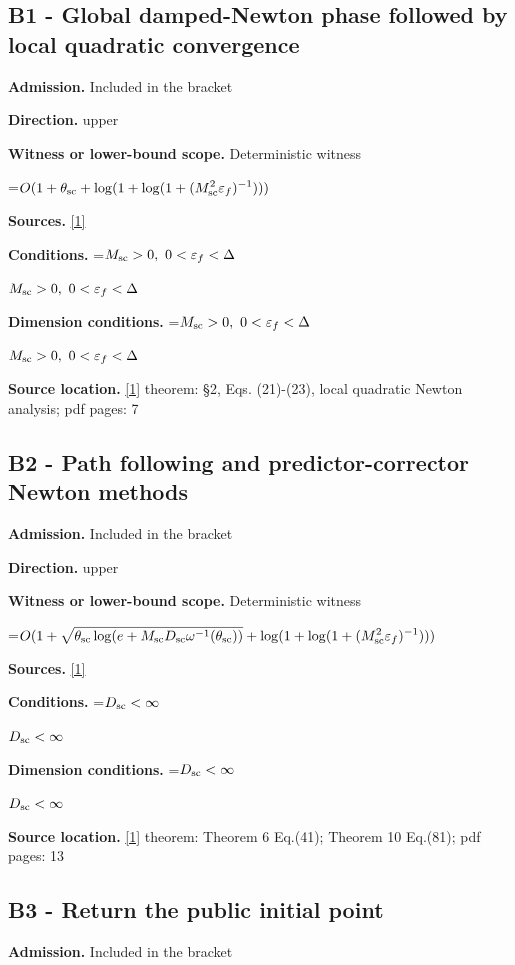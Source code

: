 \documentclass[10pt,a4paper]{article}
\newcommand{\AtlasMath}[1]{\par\begingroup\centering\setbox0=\hbox{$\displaystyle #1$}\ifdim\wd0>1.4\linewidth\typeout{ATLAS WIDE FORMULA: \the\wd0}\fi\ifdim\wd0>\linewidth\resizebox{\linewidth}{!}{\box0}\else\box0\fi\par\endgroup}
\newcommand{\AtlasInlineMath}[1]{\begingroup\setbox0=\hbox{$#1$}\ifdim\wd0>.4\linewidth\endgroup\AtlasMath{#1}\else\endgroup$#1$\fi}
\begin{document}
\subsection{B1 - Global damped-Newton phase followed by local quadratic convergence}
\textbf{Admission.} Included in the bracket

\textbf{Direction.} upper

\textbf{Witness or lower-bound scope.} Deterministic witness

\AtlasMath{O(1+\theta_{\rm sc}+\log(1+\log(1+(M_{\rm sc}^2\varepsilon_f)^{-1})))}
\textbf{Sources.} \href{https://arxiv.org/pdf/2408.11022v1}{[1]}

\textbf{Conditions.} \AtlasInlineMath{M_{\rm sc}>0,\ 0<\varepsilon_f<\Delta}

\textbf{Dimension conditions.} \AtlasInlineMath{M_{\rm sc}>0,\ 0<\varepsilon_f<\Delta}

\textbf{Source location.} \href{https://arxiv.org/pdf/2408.11022v1}{[1]} theorem: §2, Eqs. (21)-(23), local quadratic Newton analysis; pdf pages: 7

\subsection{B2 - Path following and predictor-corrector Newton methods}
\textbf{Admission.} Included in the bracket

\textbf{Direction.} upper

\textbf{Witness or lower-bound scope.} Deterministic witness

\AtlasMath{O(1+\sqrt{\theta_{\rm sc}\log(e+M_{\rm sc}D_{\rm sc}\omega^{-1}(\theta_{\rm sc}))}+\log(1+\log(1+(M_{\rm sc}^2\varepsilon_f)^{-1})))}
\textbf{Sources.} \href{https://arxiv.org/pdf/2408.11022v1}{[1]}

\textbf{Conditions.} \AtlasInlineMath{D_{\rm sc}<\infty}

\textbf{Dimension conditions.} \AtlasInlineMath{D_{\rm sc}<\infty}

\textbf{Source location.} \href{https://arxiv.org/pdf/2408.11022v1}{[1]} theorem: Theorem 6 Eq.(41); Theorem 10 Eq.(81); pdf pages: 13

\subsection{B3 - Return the public initial point}
\textbf{Admission.} Included in the bracket
\end{document}
